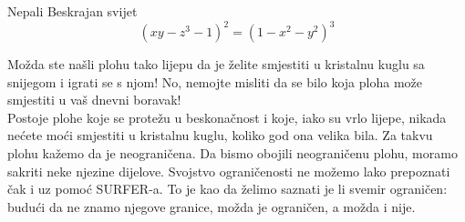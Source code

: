 \begin{surferPage}{Nepali}
Beskrajan svijet\\

\smallskip
\[(x y - z^3 -1)^2= (1 - x^2	- y^2)^3\]

\singlespacing
Mo\v{z}da ste na\v{s}li plohu tako lijepu da je \v{z}elite smjestiti u kristalnu kuglu sa snijegom i igrati se s njom! No, nemojte misliti da se bilo koja ploha mo\v{z}e smjestiti u va\v{s} dnevni boravak!
\\
\singlespacing
Postoje plohe koje se prote\v{z}u u beskona\v{c}nost i koje, iako su vrlo lijepe, nikada ne\'{c}ete mo\'{c}i smjestiti u kristalnu kuglu, koliko god ona velika bila. Za takvu plohu ka\v{z}emo da je neograni\v{c}ena. Da bismo obojili neograni\v{c}enu plohu, moramo sakriti neke njezine dijelove.
\singlespacing
Svojstvo ograni\v{c}enosti ne mo\v{z}emo lako prepoznati \v{c}ak i uz pomo\'{c} SURFER-a. To je kao da \v{z}elimo saznati je li svemir ograni\v{c}en: budu\'{c}i da ne znamo njegove granice, mo\v{z}da je ograni\v{c}en, a mo\v{z}da i nije.
\end{surferPage}

